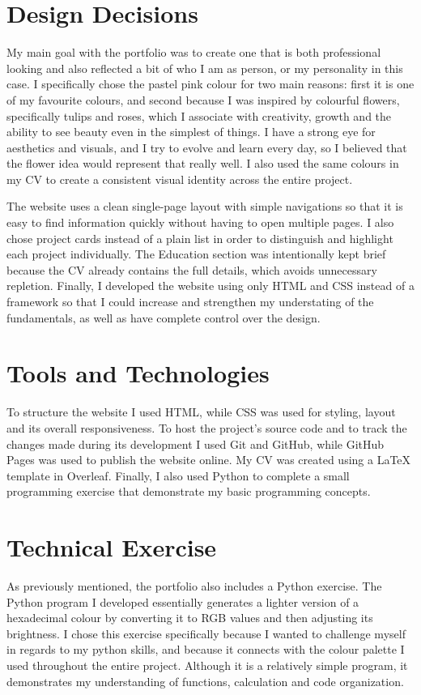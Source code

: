 \documentclass[12pt, a4paper]{article}
\begin{document}
\section{Design Decisions}
My main goal with the portfolio was to create one that is both professional looking and also reflected a bit of who I am as person, or my personality in this case. I specifically chose the pastel pink colour for two main reasons: first it is one of my favourite colours, and second because I was inspired by colourful flowers, specifically tulips and roses, which I associate with creativity, growth and the ability to see beauty even in the simplest of things. I have a strong eye for aesthetics and visuals, and I try to evolve and learn every day, so I believed that the flower idea would represent that really well. I also used the same colours in my CV to create a consistent visual identity across the entire project.

The website uses a clean single-page layout with simple navigations so that it is easy to find information quickly without having to open multiple pages. I also chose project cards instead of a plain list in order to distinguish and highlight each project individually. The Education section was intentionally kept brief because the CV already contains the full details, which avoids unnecessary repletion. Finally, I developed the website using only HTML and CSS instead of a framework so that I could increase and strengthen my understating of the fundamentals, as well as have complete control over the design.

\section{Tools and Technologies}
To structure the website I used HTML, while CSS was used for styling, layout and its overall responsiveness. To host the project's source code and to track the changes made during its development I used Git and GitHub, while GitHub Pages was used to publish the website online. My CV was created using a LaTeX template in Overleaf. Finally, I also used Python to complete a small programming exercise that demonstrate my basic programming concepts.

\section{Technical Exercise}
As previously mentioned, the portfolio also includes a Python exercise. The Python program I developed essentially generates a lighter version of a hexadecimal colour by converting it to RGB values and then adjusting its brightness. I chose this exercise specifically because I wanted to challenge myself in regards to my python skills, and because it connects with the colour palette I used throughout the entire project. Although it is a relatively simple program, it demonstrates my understanding of functions, calculation and code organization.
\end{document}
